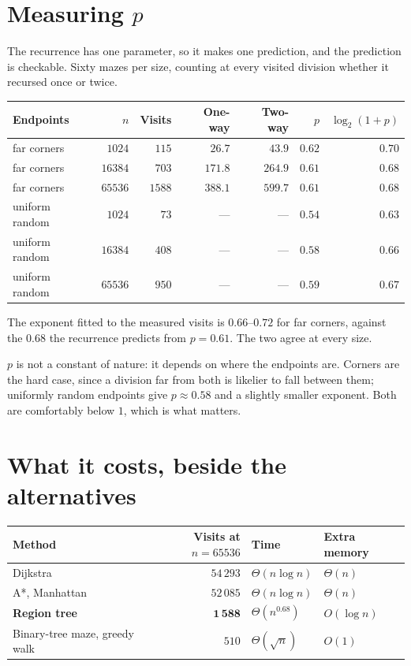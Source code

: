 \documentclass[11pt,a4paper]{article}
\begin{document}
\section{Measuring \texorpdfstring{$p$}{p}}

The recurrence has one parameter, so it makes one prediction, and the prediction
is checkable. Sixty mazes per size, counting at every visited division whether
it recursed once or twice.

\begin{center}
\begin{tabular}{@{}lrrrrrr@{}}
  \toprule
  Endpoints & $n$ & Visits & One-way & Two-way & $p$ & $\log_2(1+p)$ \\
  \midrule
  far corners    & $1024$  & $115$  & $26.7$  & $43.9$  & $0.62$ & $0.70$ \\
  far corners    & $16384$ & $703$  & $171.8$ & $264.9$ & $0.61$ & $0.68$ \\
  far corners    & $65536$ & $1588$ & $388.1$ & $599.7$ & $0.61$ & $0.68$ \\
  \midrule
  uniform random & $1024$  & $73$   & --- & --- & $0.54$ & $0.63$ \\
  uniform random & $16384$ & $408$  & --- & --- & $0.58$ & $0.66$ \\
  uniform random & $65536$ & $950$  & --- & --- & $0.59$ & $0.67$ \\
  \bottomrule
\end{tabular}
\end{center}

The exponent fitted to the measured visits is $0.66$--$0.72$ for far corners,
against the $0.68$ the recurrence predicts from $p=0.61$. The two agree at every
size.

$p$ is not a constant of nature: it depends on where the endpoints are. Corners
are the hard case, since a division far from both is likelier to fall between
them; uniformly random endpoints give $p\approx0.58$ and a slightly smaller
exponent. Both are comfortably below $1$, which is what matters.



\section{What it costs, beside the alternatives}

\begin{center}
\begin{tabular}{@{}lrll@{}}
  \toprule
  Method & Visits at $n=65536$ & Time & Extra memory \\
  \midrule
  Dijkstra                    & $54\,293$ & $\Theta(n\log n)$   & $\Theta(n)$ \\
  A*, Manhattan               & $52\,085$ & $\Theta(n\log n)$   & $\Theta(n)$ \\
  \textbf{Region tree}        & $\mathbf{1\,588}$ & $\Theta(n^{0.68})$ & $O(\log n)$ \\
  \midrule
  Binary-tree maze, greedy walk & $510$   & $\Theta(\sqrt n)$   & $O(1)$ \\
  \bottomrule
\end{tabular}
\end{center}
\end{document}
